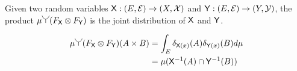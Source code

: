 Given two random variables $\mathsf{X}:(E,\mathcal{E})\to (X,\mathcal{X})$ and $\mathsf{Y}:(E,\mathcal{E})\to (Y,\mathcal{Y})$, the product $\mu\splitter{0.15}(F_{\RV{X}}\otimes F_{\RV{Y}})$ is the joint distribution of $\mathsf{X}$ and $\mathsf{Y}$.

\begin{align}
    \mu \splitter{0.15}(F_{\RV{X}}\otimes F_{\RV{Y}}) (A\times B) &= \int_E \delta_{\RV{X}(x)}(A) \delta_{\RV{Y}(x)}(B) d\mu \\
                        &= \mu(\RV{X}^{-1}(A)\cap \RV{Y}^{-1}(B))
\end{align}

